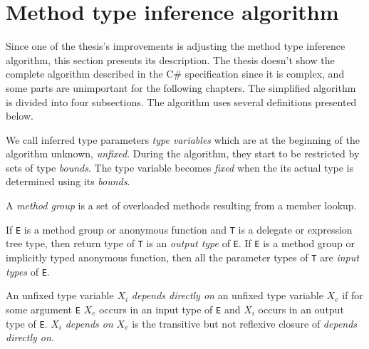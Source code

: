 \section{Method type inference algorithm} \label{sect02:MTIA}

Since one of the thesis's improvements is adjusting the method type inference algorithm, this section presents
its description. 
The thesis doesn’t show the complete algorithm described in the C\# specification \cite{online:csTypeInference} since it is complex, and some parts are unimportant for the following chapters. 
The simplified algorithm is divided into four subsections. 
The algorithm uses several definitions presented below.
\begin{defn}
We call inferred type parameters \emph{type variables} which are at the beginning of the algorithm unknown, \emph{unfixed}. 
During the algorithm, they start to be restricted by sets of type \emph{bounds}.
The type variable becomes \emph{fixed} when the its actual type is determined using its \emph{bounds}.
\end{defn}
\begin{defn}
A \emph{method group} is a set of overloaded methods resulting from a member lookup.
\end{defn}
\begin{defn}
If \texttt{E} is a method group or anonymous function and \texttt{T} is a delegate or expression tree type, then return type of \texttt{T} is an \emph{output type} of \texttt{E}.
If \texttt{E} is a method group or implicitly typed anonymous function, then all the parameter types of \texttt{T} are \emph{input types} of \texttt{E}. 
\end{defn}
\begin{defn}[Dependence]
An unfixed type variable \texttt{$X_i$} \emph{depends directly on} an unfixed type variable \texttt{$X_e$} if for some argument \texttt{E} \texttt{$X_e$} occurs in an input type of \texttt{E} and \texttt{$X_i$} occurs in an output type of \texttt{E}.
\texttt{$X_i$} \emph{depends on} \texttt{$X_e$} is the transitive but not reflexive closure of \emph{depends directly on}.
\end{defn}
